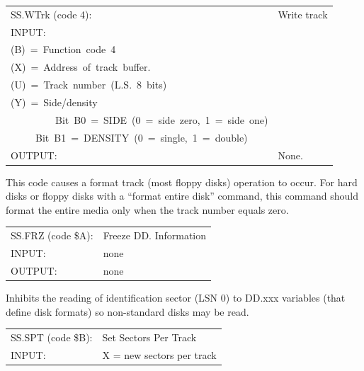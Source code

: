 \documentclass[
]{article}
\newcounter{none} %
\begin{document}
{\def\LTcaptype{none} %
\begin{longtable}[]{@{}
  >{\raggedright\arraybackslash}p{}
  >{\raggedright\arraybackslash}p{}@{}}
\toprule\noalign{}
\endhead
\bottomrule\noalign{}
\endlastfoot
SS.WTrk (code 4): & Write track \\
INPUT: & \begin{minipage}[t]{\linewidth}\raggedright
(A)~=~Path~number\\
(B)~=~Function~code~4\\
(X)~=~Address~of~track~buffer.\\
(U)~=~Track~number~(L.S.~8~bits)\\
(Y)~=~Side/density\\
\strut ~~~~~~~~~Bit~B0~=~SIDE~(0~=~side~zero,~1~=~side~one)\\
\strut ~~~~~Bit~B1~=~DENSITY~(0~=~single,~1~=~double)
\end{minipage} \\
OUTPUT: & None. \\
\end{longtable}
}

This code causes a format track (most floppy disks) operation to occur.
For hard disks or floppy disks with a ``format entire disk'' command,
this command should format the entire media only when the track number
equals zero.

{\def\LTcaptype{none} %
\begin{longtable}[]{@{}
  >{\raggedright\arraybackslash}p{}
  >{\raggedright\arraybackslash}p{}@{}}
\toprule\noalign{}
\endhead
\bottomrule\noalign{}
\endlastfoot
SS.FRZ (code \$A): & Freeze DD. Information \\
INPUT: & none \\
OUTPUT: & none \\
\end{longtable}
}

Inhibits the reading of identification sector (LSN 0) to DD.xxx
variables (that define disk formats) so non-standard disks may be read.

{\def\LTcaptype{none} %
\begin{longtable}[]{@{}
  >{\raggedright\arraybackslash}p{}
  >{\raggedright\arraybackslash}p{}@{}}
\toprule\noalign{}
\endhead
\bottomrule\noalign{}
\endlastfoot
SS.SPT (code \$B): & Set Sectors Per Track \\
INPUT: & X = new sectors per track \\
\end{longtable}
}
\end{document}
